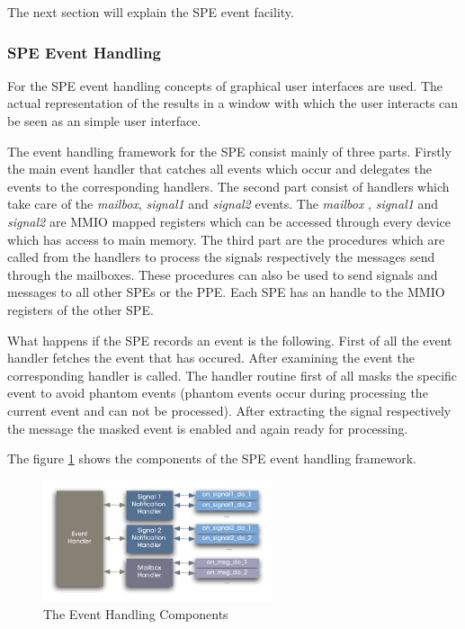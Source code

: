 \documentclass[DIV10, abstracton, openright, footsepline, headsepline, twoside, 9pt,
bigheadings]{scrreprt}
\begin{document}
The next section will explain the SPE event facility.



\subsubsection{SPE Event Handling}
\label{sec:design_spe_event_handling}

For the SPE event handling concepts of graphical user interfaces are used. The actual
representation of the results in a window with which the user interacts can be seen
as an simple user interface.


The event handling framework for the SPE consist mainly of three parts. Firstly
the main event handler that catches all events which occur and delegates the
events to the corresponding handlers. The second part consist of handlers which take
care of the \textit{mailbox}, \textit{signal1} and \textit{signal2} events.
The  \textit{mailbox} , \textit{signal1} and \textit{signal2} are MMIO mapped
registers  which can be accessed through every device which has access to main
memory.
The third part are the procedures which are called from the handlers to process
the signals respectively the messages send through the mailboxes. These procedures
can also be used to send signals and messages to all other SPEs or the PPE. Each
SPE has an handle to the MMIO registers of the other SPE.

What happens if the SPE records an event is the following. First of all
the event handler fetches the event that has occured. After examining the event
the corresponding handler is called. The handler routine first of all masks the
specific event to avoid phantom events (phantom events occur during processing
the current event  and  can not be processed). After extracting the signal
respectively the message the masked event is enabled and again ready for processing.

The figure \ref{fig:event_handling_comp} shows the components of the SPE event
handling framework.

\begin{figure}[H]
\centering
\includegraphics[width=0.6\textwidth]{diagramme/event_handling}
\caption{The Event Handling Components}
\label{fig:event_handling_comp}
\end{figure}
\end{document}
